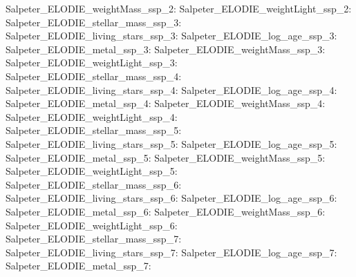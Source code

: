 Salpeter\_ELODIE\_weightMass\_ssp\_2:  \newline 
Salpeter\_ELODIE\_weightLight\_ssp\_2:  \newline 
Salpeter\_ELODIE\_stellar\_mass\_ssp\_3:  \newline 
Salpeter\_ELODIE\_living\_stars\_ssp\_3:  \newline 
Salpeter\_ELODIE\_log\_age\_ssp\_3:  \newline 
Salpeter\_ELODIE\_metal\_ssp\_3:  \newline 
Salpeter\_ELODIE\_weightMass\_ssp\_3:  \newline 
Salpeter\_ELODIE\_weightLight\_ssp\_3:  \newline 
Salpeter\_ELODIE\_stellar\_mass\_ssp\_4:  \newline 
Salpeter\_ELODIE\_living\_stars\_ssp\_4:  \newline 
Salpeter\_ELODIE\_log\_age\_ssp\_4:  \newline 
Salpeter\_ELODIE\_metal\_ssp\_4:  \newline 
Salpeter\_ELODIE\_weightMass\_ssp\_4:  \newline 
Salpeter\_ELODIE\_weightLight\_ssp\_4:  \newline 
Salpeter\_ELODIE\_stellar\_mass\_ssp\_5:  \newline 
Salpeter\_ELODIE\_living\_stars\_ssp\_5:  \newline 
Salpeter\_ELODIE\_log\_age\_ssp\_5:  \newline 
Salpeter\_ELODIE\_metal\_ssp\_5:  \newline 
Salpeter\_ELODIE\_weightMass\_ssp\_5:  \newline 
Salpeter\_ELODIE\_weightLight\_ssp\_5:  \newline 
Salpeter\_ELODIE\_stellar\_mass\_ssp\_6:  \newline 
Salpeter\_ELODIE\_living\_stars\_ssp\_6:  \newline 
Salpeter\_ELODIE\_log\_age\_ssp\_6:  \newline 
Salpeter\_ELODIE\_metal\_ssp\_6:  \newline 
Salpeter\_ELODIE\_weightMass\_ssp\_6:  \newline 
Salpeter\_ELODIE\_weightLight\_ssp\_6:  \newline 
Salpeter\_ELODIE\_stellar\_mass\_ssp\_7:  \newline 
Salpeter\_ELODIE\_living\_stars\_ssp\_7:  \newline 
Salpeter\_ELODIE\_log\_age\_ssp\_7:  \newline 
Salpeter\_ELODIE\_metal\_ssp\_7:  \newline 
